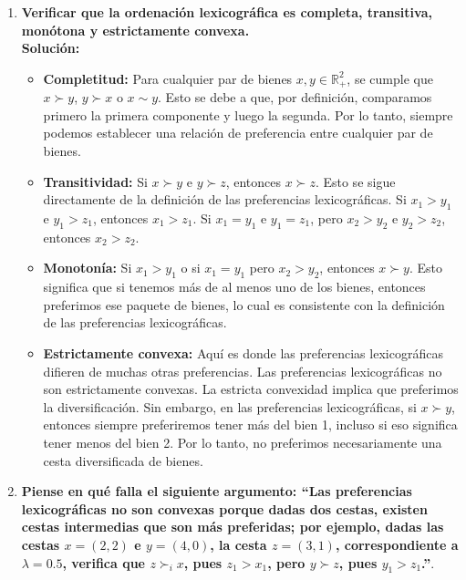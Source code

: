 \begin{enumerate}
\begin{enumerate}[\bfseries a)]
\begin{center}
		\end{center}


	    \item \textbf{Verificar que la ordenación lexicográfica es completa, transitiva, monótona y estrictamente convexa.}\\

		\textbf{Solución:}

		\begin{itemize}

		    \item \textbf{Completitud:} Para cualquier par de bienes $x, y \in \mathbb{R}^2_+$, se cumple que $x \succ y$, $y \succ x$ o $x \sim y$. Esto se debe a que, por definición, comparamos primero la primera componente y luego la segunda. Por lo tanto, siempre podemos establecer una relación de preferencia entre cualquier par de bienes.

		    \item \textbf{Transitividad:} Si $x \succ y$ e $y \succ z$, entonces $x \succ z$. Esto se sigue directamente de la definición de las preferencias lexicográficas. Si $x_1 > y_1$ e $y_1 > z_1$, entonces $x_1 > z_1$. Si $x_1 = y_1$ e $y_1 = z_1$, pero $x_2 > y_2$ e $y_2 > z_2$, entonces $x_2 > z_2$.

		    \item \textbf{Monotonía:} Si $x_1 > y_1$ o si $x_1 = y_1$ pero $x_2 > y_2$, entonces $x \succ y$. Esto significa que si tenemos más de al menos uno de los bienes, entonces preferimos ese paquete de bienes, lo cual es consistente con la definición de las preferencias lexicográficas.

		    \item \textbf{Estrictamente convexa:} Aquí es donde las preferencias lexicográficas difieren de muchas otras preferencias. Las preferencias lexicográficas no son estrictamente convexas. La estricta convexidad implica que preferimos la diversificación. Sin embargo, en las preferencias lexicográficas, si $x \succ y$, entonces siempre preferiremos tener más del bien 1, incluso si eso significa tener menos del bien 2. Por lo tanto, no preferimos necesariamente una cesta diversificada de bienes.\\

		\end{itemize}

	    \item \textbf{\boldmath Piense en qué falla el siguiente argumento: “Las preferencias lexicográficas no son convexas porque dadas dos cestas, existen cestas intermedias que son más preferidas; por ejemplo, dadas las cestas $x = (2, 2)$ e $y = (4, 0)$, la cesta $z = (3, 1)$, correspondiente a $\lambda = 0.5$, verifica que $z\succ_i x$, pues $z_1>x_1$, pero $y \succ z$, pues $y_1 > z_1$.”}.\\


\end{enumerate}
\end{enumerate}
